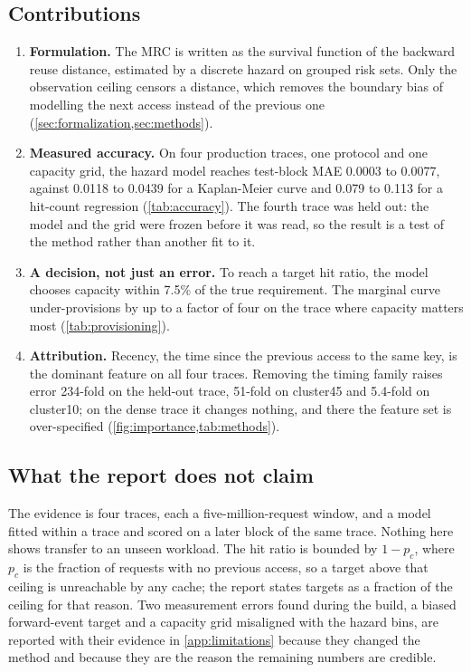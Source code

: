 \subsection{Contributions}
\label{sec:contributions}

\begin{enumerate}[leftmargin=1.2em,itemsep=2pt]
  \item \textbf{Formulation.} The MRC is written as the survival function of the
  backward reuse distance, estimated by a discrete hazard on grouped risk sets.
  Only the observation ceiling censors a distance, which removes the boundary bias
  of modelling the next access instead of the previous one
  (\cref{sec:formalization,sec:methods}).
  \item \textbf{Measured accuracy.} On four production traces, one protocol and
  one capacity grid, the hazard model reaches test-block MAE 0.0003 to 0.0077,
  against 0.0118 to 0.0439 for a Kaplan-Meier curve and 0.079 to 0.113 for a
  hit-count regression (\cref{tab:accuracy}). The fourth trace was held out: the
  model and the grid were frozen before it was read, so the result is a test of the
  method rather than another fit to it.
  \item \textbf{A decision, not just an error.} To reach a target hit ratio, the
  model chooses capacity within 7.5\% of the true requirement. The marginal curve
  under-provisions by up to a factor of four on the trace where capacity matters
  most (\cref{tab:provisioning}).
  \item \textbf{Attribution.} Recency, the time since the previous access to the
  same key, is the dominant feature on all four traces. Removing the timing family
  raises error 234-fold on the held-out trace, 51-fold on cluster45 and 5.4-fold on
  cluster10; on the dense trace it changes nothing, and there the feature set is
  over-specified (\cref{fig:importance,tab:methods}).
\end{enumerate}

\subsection{What the report does not claim}
\label{sec:nonclaims}

The evidence is four traces, each a five-million-request window, and a model
fitted within a trace and scored on a later block of the same trace. Nothing here
shows transfer to an unseen workload. The hit ratio is bounded by
$1-p_c$, where $p_c$ is the fraction of requests with no previous access, so a
target above that ceiling is unreachable by any cache; the report states targets as
a fraction of the ceiling for that reason. Two measurement errors found during the
build, a biased forward-event target and a capacity grid misaligned with the hazard
bins, are reported with their evidence in \cref{app:limitations} because they
changed the method and because they are the reason the remaining numbers are
credible.


